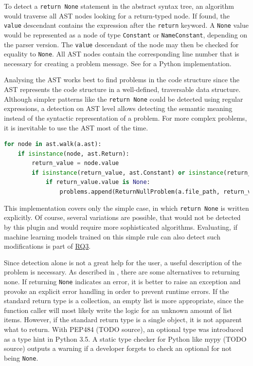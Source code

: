 \begin{description}
    To detect a \texttt{return None} statement in the abstract syntax tree, an algorithm would traverse all AST nodes looking for a return-typed node. If found, the \texttt{value} descendant contains the expression after the \texttt{return} keyword. A \texttt{None} value would be represented as a node of type \texttt{Constant} or \texttt{NameConstant}, depending on the parser version. The \texttt{value} descendant of the node may then be checked for equality to \texttt{None}. All AST nodes contain the corresponding line number that is necessary for creating a problem message. See  for a Python implementation. 


    Analysing the AST works best to find problems in the code structure since the AST represents the code structure in a well-defined, traversable data structure. Although simpler patterns like the \texttt{return None} could be detected using regular expressions, a detection on AST level allows detecting the semantic meaning instead of the syntactic representation of a problem. For more complex problems, it is inevitable to use the AST most of the time.
\end{description}

\begin{lstlisting}[float,floatplacement=h, language=Python, label=lst:return_none_detection_algorithm, caption={Detecting a \texttt{return None} by analsing the AST data structure.}]
for node in ast.walk(a.ast):
    if isinstance(node, ast.Return):
        return_value = node.value
        if isinstance(return_value, ast.Constant) or isinstance(return_value, ast.NameConstant):
            if return_value.value is None:
                problems.append(ReturnNullProblem(a.file_path, return_value.lineno))\end{lstlisting}


This implementation covers only the simple case, in which \texttt{return None} is written explicitly. Of course, several variations are possible, that would not be detected by this plugin and would require more sophisticated algorithms. Evaluating, if machine learning models trained on this simple rule can also detect such modifications is part of \hyperref[rq:3]{RQ3}.

Since detection alone is not a great help for the user, a useful description of the problem is necessary. 
As described in , there are some alternatives to returning none. If returning \texttt{None} indicates an error, it is better to raise an exception and provoke an explicit error handling in order to prevent runtime errors. If the standard return type is a collection, an empty list is more appropriate, since the function caller will most likely write the logic for an unknown amount of list items. However, if the standard return type is a single object, it is not apparent what to return. With PEP484 (TODO source), an optional type was introduced as a type hint in Python 3.5. A static type checker for Python like mypy (TODO source) outputs a warning if a developer forgets to check an optional for not being \texttt{None}. 

